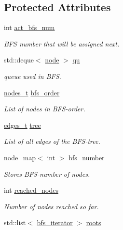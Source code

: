 \subsection*{Protected Attributes}
\begin{DoxyCompactItemize}
\item 
int \mbox{\hyperlink{classbfs_a5a4adad9562896536b8b58ab237e8478}{act\+\_\+bfs\+\_\+num}}
\begin{DoxyCompactList}\small\item\em B\+FS number that will be assigned next. \end{DoxyCompactList}\item 
std\+::deque$<$ \mbox{\hyperlink{classnode}{node}} $>$ \mbox{\hyperlink{classbfs_ad2ef1030dcc16a1056e6ef6dfc3f1b6b}{qu}}
\begin{DoxyCompactList}\small\item\em queue used in B\+FS. \end{DoxyCompactList}\item 
\mbox{\hyperlink{edge_8h_a22ac17689106ba21a84e7bc54d1199d6}{nodes\+\_\+t}} \mbox{\hyperlink{classbfs_a2596d2cf52f6e7922fd94ce1adde760e}{bfs\+\_\+order}}
\begin{DoxyCompactList}\small\item\em List of nodes in B\+F\+S-\/order. \end{DoxyCompactList}\item 
\mbox{\hyperlink{edge_8h_a8f9587479bda6cf612c103494b3858e3}{edges\+\_\+t}} \mbox{\hyperlink{classbfs_a8bc83afea6d1066ea4ceca3007799912}{tree}}
\begin{DoxyCompactList}\small\item\em List of all edges of the B\+F\+S-\/tree. \end{DoxyCompactList}\item 
\mbox{\hyperlink{classnode__map}{node\+\_\+map}}$<$ int $>$ \mbox{\hyperlink{classbfs_a59d0c5c5ad2715776b20b1aec03dbc3a}{bfs\+\_\+number}}
\begin{DoxyCompactList}\small\item\em Stores B\+F\+S-\/number of nodes. \end{DoxyCompactList}\item 
int \mbox{\hyperlink{classbfs_ac3db80b59d5db049199936445a6c2da8}{reached\+\_\+nodes}}
\begin{DoxyCompactList}\small\item\em Number of nodes reached so far. \end{DoxyCompactList}\item 
std\+::list$<$ \mbox{\hyperlink{classbfs_a1035f068a96de0370789ec315aef4f73}{bfs\+\_\+iterator}} $>$ \mbox{\hyperlink{classbfs_acea071a6fdad8e590b40830ced241824}{roots}}

\end{DoxyCompactItemize}
